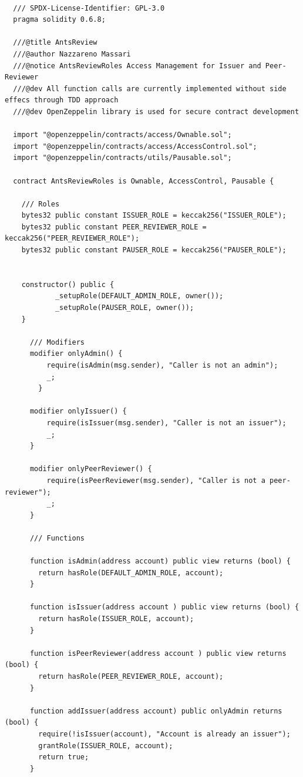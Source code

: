 \documentclass[runningheads]{llncs}
\begin{document}
\begin{lstlisting}[language=Solidity]

  /// SPDX-License-Identifier: GPL-3.0
  pragma solidity 0.6.8;

  ///@title AntsReview
  ///@author Nazzareno Massari
  ///@notice AntsReviewRoles Access Management for Issuer and Peer-Reviewer
  ///@dev All function calls are currently implemented without side effecs through TDD approach
  ///@dev OpenZeppelin library is used for secure contract development

  import "@openzeppelin/contracts/access/Ownable.sol";
  import "@openzeppelin/contracts/access/AccessControl.sol";
  import "@openzeppelin/contracts/utils/Pausable.sol";

  contract AntsReviewRoles is Ownable, AccessControl, Pausable {

    /// Roles
    bytes32 public constant ISSUER_ROLE = keccak256("ISSUER_ROLE");
    bytes32 public constant PEER_REVIEWER_ROLE = keccak256("PEER_REVIEWER_ROLE");
    bytes32 public constant PAUSER_ROLE = keccak256("PAUSER_ROLE");


    constructor() public {
            _setupRole(DEFAULT_ADMIN_ROLE, owner());
            _setupRole(PAUSER_ROLE, owner());
    }

      /// Modifiers
      modifier onlyAdmin() {
          require(isAdmin(msg.sender), "Caller is not an admin");
          _;
        }

      modifier onlyIssuer() {
          require(isIssuer(msg.sender), "Caller is not an issuer");
          _;
      }

      modifier onlyPeerReviewer() {
          require(isPeerReviewer(msg.sender), "Caller is not a peer-reviewer");
          _;
      }

      /// Functions

      function isAdmin(address account) public view returns (bool) {
        return hasRole(DEFAULT_ADMIN_ROLE, account);
      }

      function isIssuer(address account ) public view returns (bool) {
        return hasRole(ISSUER_ROLE, account);
      }

      function isPeerReviewer(address account ) public view returns (bool) {
        return hasRole(PEER_REVIEWER_ROLE, account);
      }

      function addIssuer(address account) public onlyAdmin returns (bool) {
        require(!isIssuer(account), "Account is already an issuer");
        grantRole(ISSUER_ROLE, account);
        return true;
      }


\end{lstlisting}
\end{document}
